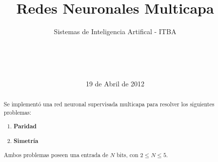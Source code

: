 \documentclass{sig-alternate}
\begin{document}
\title{Redes Neuronales Multicapa}
\subtitle{Sistemas de Inteligencia Artifical - ITBA}


\author{
	\\
	\\
	\\	
}

\date{19 de Abril de 2012}

\maketitle

\begin{abstract}
	Se implement\'o una red neuronal supervisada multicapa para resolver los siguientes problemas:
	\begin{enumerate}
 		\item \textbf{Paridad} \label{parity}
		\item \textbf{Simetr\'ia}	\label{symmetric}
	\end{enumerate}
	Ambos problemas poseen una entrada de $N$ bits, con $2 \leq N \leq 5$.
\end{abstract}
\end{document}
